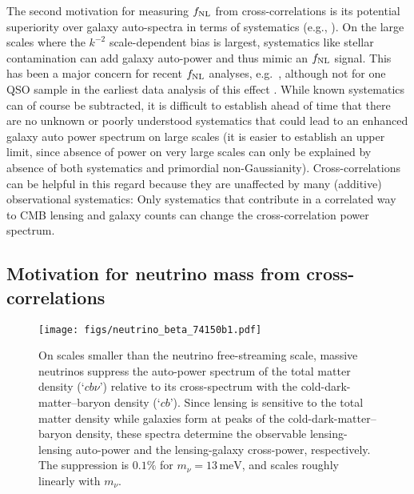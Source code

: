 \documentclass[prd,superscriptaddress,floatfix,notitlepage,nofootinbib,reprint]{revtex4-1} %
\begin{document}
The second motivation for measuring ${f_\mathrm{NL}}$ from cross-correlations is its potential superiority over galaxy auto-spectra in terms of systematics (e.g., \cite{Giannantonio:2013kqa,Rhodes:2013fyq}).
On the large scales where the $k^{-2}$ scale-dependent bias is largest, systematics like stellar contamination can add galaxy auto-power and thus mimic an ${f_\mathrm{NL}}$ signal.
This has been a major concern for recent ${f_\mathrm{NL}}$ analyses, e.g.~\cite{Leistedt1404,Leistedt1405}, although not for one QSO sample 
in the earliest data analysis of this effect \cite{Slosar0805}. 
While known systematics can of course be subtracted, it is difficult to establish ahead of time that there are no unknown or poorly understood systematics that could lead to an enhanced galaxy auto power spectrum on large scales (it is easier to establish an upper limit, since absence of power on very large scales 
can only be explained by absence of both systematics and primordial 
non-Gaussianity).
Cross-correlations can be helpful in this regard because they are unaffected by many (additive) observational systematics:  Only systematics that contribute in a correlated way to CMB lensing and galaxy counts can change the cross-correlation power spectrum.



\subsection{Motivation for neutrino mass from cross-correlations}


\begin{figure}[tbp]
\texttt{[image: figs/neutrino\_beta\_74150b1.pdf]}
\caption{On scales smaller than the neutrino free-streaming scale, massive neutrinos suppress the auto-power spectrum of the total matter density (`$cb\nu$') relative to its cross-spectrum with the cold-dark-matter--baryon density (`$cb$'). 
Since lensing is sensitive to the total matter density while galaxies form at peaks of the cold-dark-matter--baryon density, these spectra determine the observable lensing-lensing auto-power and the lensing-galaxy cross-power, respectively.
The suppression is $0.1\%$ for $m_\nu=13\,\mathrm{meV}$, and scales roughly linearly with $m_\nu$.
}
\label{fig:NeutrinoTransfer}
\end{figure}
\end{document}

